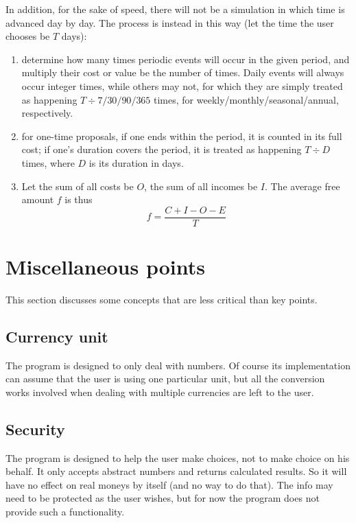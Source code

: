 In addition, for the sake of speed, there will not be a simulation in which time is advanced day by day. The process is instead in this way (let the time the user chooses be $T$ days):
\begin{enumerate}
	\item determine how many times periodic events will occur in the given period, and multiply their cost or value be the number of times. Daily events will always occur integer times, while others may not, for which they are simply treated as happening $T \div 7/30/90/365$ times, for weekly/monthly/seasonal/annual, respectively.
	\item for one-time proposals, if one ends within the period, it is counted in its full cost; if one's duration covers the period, it is treated as happening $T \div D$ times, where $D$ is its duration in days.
	\item Let the sum of all costs be $O$, the sum of all incomes be $I$. The average free amount $f$ is thus
	\[
	f = \frac{C + I - O - E}{T}
	\]
\end{enumerate}

\section{Miscellaneous points}
This section discusses some concepts that are less critical than key points.

\subsection{Currency unit}
The program is designed to only deal with numbers. Of course its implementation can assume that the user is using one particular unit, but all the conversion works involved when dealing with multiple currencies are left to the user.

\subsection{Security}
The program is designed to help the user make choices, not to make choice on his behalf. It only accepts abstract numbers and returns calculated results. So it will have no effect on real moneys by itself (and no way to do that). The info may need to be protected as the user wishes, but for now the program does not provide such a functionality.